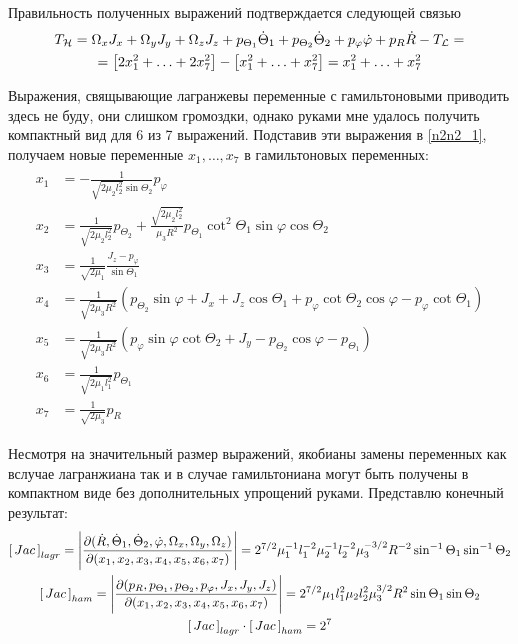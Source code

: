 \documentclass[12pt]{article}
\newcommand{\lb}{\left(}
\newcommand{\rb}{\right)}
\newcommand{\mL}{\mathcal{L}}
\newcommand{\mH}{\mathcal{H}}
\newcommand{\dR}{\dot{R}}
\newcommand{\JacL}{\left[ \, Jac \, \right]_{lagr}}
\newcommand{\JacH}{\left[ \, Jac \, \right]_{ham}}
\newcommand{\dtone}{\dot{\Theta}_1}
\newcommand{\dttwo}{\dot{\Theta}_2}
\newcommand{\ptone}{p_{\Theta_1}}
\newcommand{\pttwo}{p_{\Theta_2}}
\newcommand{\pphi}{p_{\varphi}}
\begin{document}
Правильность полученных выражений подтверждается следующей связью
\begin{gather}
		T_\mH = \Omega_x J_x + \Omega_y J_y + \Omega_z J_z + \ptone \dtone + \pttwo \dttwo + \pphi \dot{\varphi} + p_R \dot{R} - T_\mL = \notag \\
	= \left[ 2 x_1 ^2 + \ldots + 2 x_7^2 \right] - \left[ x_1^2 + \ldots + x_7^2 \right] = x_1^2 + \ldots + x_7^2 \notag
\end{gather}

Выражения, свящывающие лагранжевы переменные с гамильтоновыми приводить здесь не буду, они слишком громоздки, однако руками мне удалось получить компактный вид для 6 из 7 выражений. Подставив эти выражения в \eqref{n2n2_1}, получаем новые переменные $x_1, \ldots, x_7$ в гамильтоновых переменных:
\begin{gather}
	\begin{aligned}
		x_1 &= - \frac{1}{\sqrt{2 \mu_2 l_2^2} \sin \Theta_2} p_\varphi \\
		x_2 &= \frac{1}{\sqrt{2 \mu_2 l_2^2}} p_{\Theta_2} + \frac{\sqrt{2 \mu_2 l_2^2}}{\mu_3 R^2} p_{\Theta_1} \cot^2 \Theta_1 \sin \varphi \cos \Theta_2 \\
		x_3 &= \frac{1}{\sqrt{2 \mu_1}} \frac{J_z - p_\varphi}{\sin \Theta_1} \\
		x_4 &= \frac{1}{\sqrt{2 \mu_3 R^2}} \lb p_{\Theta_2} \sin \varphi + J_x + J_z \cos \Theta_1 + p_\varphi \cot \Theta_2 \cos \varphi - p_\varphi \cot \Theta_1 \rb \\
		x_5 &= \frac{1}{\sqrt{2 \mu_3 R^2}} \lb p_\varphi \sin \varphi \cot \Theta_2 + J_y - p_{\Theta_2} \cos \varphi - p_{\Theta_1} \rb \\
		x_6 &= \frac{1}{\sqrt{2 \mu_1 l_1^2}} p_{\Theta_1} \\
		x_7 &= \frac{1}{\sqrt{2 \mu_3}} p_R
	\end{aligned}
\end{gather}

Несмотря на значительный размер выражений, якобианы замены переменных как вслучае лагранжиана так и в случае гамильтониана могут быть получены в компактном виде без дополнительных упрощений руками. Представлю конечный результат:
\begin{gather}
		\JacL = \Bigg{|} \frac{\partial ( \dR, \dot{\Theta}_1, \dot{\Theta}_2, \dot{\varphi}, \Omega_x, \Omega_y, \Omega_z )}{\partial ( x_1, x_2, x_3, x_4, x_5, x_6, x_7 )} \Bigg{|} = 2^{7/2} \mu_1^{-1} l_1^{-2} \mu_2^{-1} l_2^{-2} \mu_3^{-3/2} R^{-2} \sin^{-1} \Theta_1 \sin^{-1} \Theta_2 \notag \\
		\JacH = \Bigg{|} \frac{\partial ( p_R, p_{\Theta_1}, p_{\Theta_2}, p_\varphi, J_x, J_y, J_z )}{\partial ( x_1, x_2, x_3, x_4, x_5, x_6, x_7) } \Bigg{|} = 2^{7/2} \mu_1 l_1^2 \mu_2 l_2^2 \mu_3^{3/2} R^2 \sin \Theta_1 \sin \Theta_2 \notag \\
		\JacL \cdot \JacH = 2^7 \notag
\end{gather}
\end{document}
